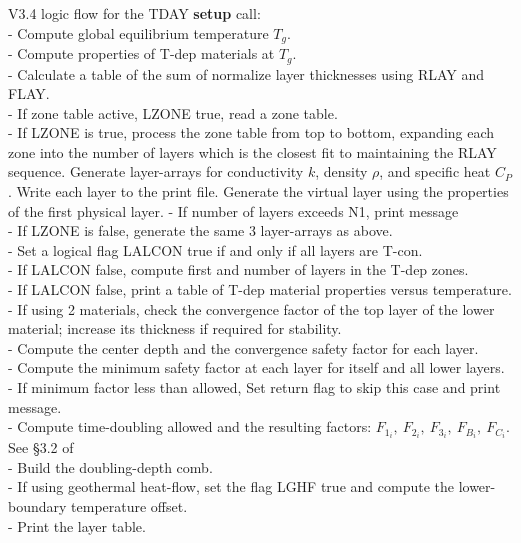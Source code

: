 \documentclass{article}
\begin{document}
\vspace{2.mm}
\large  V3.4 logic flow for the TDAY \textbf{setup} call: \normalsize
\\ - Compute global equilibrium temperature $T_g$.
\\ - Compute properties of T-dep materials at $T_g$.
\\ - Calculate a table of the sum of normalize layer thicknesses using RLAY and FLAY.
\\ - If zone table active, LZONE true, read a zone table.
\\ - If LZONE is true, process the zone table from top to bottom, expanding each
zone into the number of layers which is the closest fit to maintaining the RLAY
sequence. Generate layer-arrays for conductivity $k$, density $\rho$, and
specific heat $C_P$.  Write each layer to the print file. Generate the virtual
layer using the properties of the first physical layer.
\qi - If number of layers exceeds N1, print message
\\ - If LZONE is false, generate the same 3 layer-arrays as above.
\\ - Set a logical flag LALCON true if and only if all layers are T-con.
\\ - If LALCON false, compute first and number of layers in the T-dep zones.
\\ - If LALCON false, print a table of T-dep material properties versus temperature.
\\ - If using 2 materials, check the convergence factor of the top layer of the lower material; increase its thickness if required for stability.
\\ - Compute the center depth and the convergence safety factor for each layer.
\\ - Compute the minimum safety factor at each layer for itself and all lower layers.
\qi - If minimum factor less than allowed, Set return flag to skip this case and print message.
\\ - Compute time-doubling allowed and the resulting factors: $F_{1_i}, \ F_{2_i}, \ F_{3_i}, \ F_{B_i}, \ F_{C_i}$. See \S 3.2 of 
\\ - Build the doubling-depth comb.
\\ - If using geothermal heat-flow, set the flag LGHF true and compute the lower-boundary temperature offset.
\\ - Print the layer table.
\end{document}
